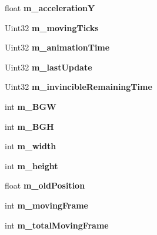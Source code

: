 \begin{DoxyCompactItemize}
\item 
\mbox{\label{class_play_level_aae739f5d0236c708e13a939b15483e16}} 
float {\bfseries m\+\_\+accelerationY}
\item 
\mbox{\label{class_play_level_a1dad415a7ca5e9b2069373fab867c3d0}} 
Uint32 {\bfseries m\+\_\+moving\+Ticks}
\item 
\mbox{\label{class_play_level_a0f69194af1bb5ef30d0263a032cb7c7b}} 
Uint32 {\bfseries m\+\_\+animation\+Time}
\item 
\mbox{\label{class_play_level_a50d5eadc62301030285f8f3382d49b79}} 
Uint32 {\bfseries m\+\_\+last\+Update}
\item 
\mbox{\label{class_play_level_af23a0f5ccc91e31c5e77fb18db4c474d}} 
Uint32 {\bfseries m\+\_\+invincible\+Remaining\+Time}
\item 
\mbox{\label{class_play_level_ab50216560efaf73720364e8141c66e86}} 
int {\bfseries m\+\_\+\+B\+GW}
\item 
\mbox{\label{class_play_level_af81a9afded3da82e441ce59fd3bae593}} 
int {\bfseries m\+\_\+\+B\+GH}
\item 
\mbox{\label{class_play_level_a2a5f3ea59acc42a33f72e4c5eacd6d8e}} 
int {\bfseries m\+\_\+width}
\item 
\mbox{\label{class_play_level_af8b496344ebe76b3b3450ccf89b14708}} 
int {\bfseries m\+\_\+height}
\item 
\mbox{\label{class_play_level_aceb34586e5b67b65c8b77e90285f34fe}} 
float {\bfseries m\+\_\+old\+Position}
\item 
\mbox{\label{class_play_level_a59077894a083c8b85ac0b4d23f85960d}} 
int {\bfseries m\+\_\+moving\+Frame}
\item 
\mbox{\label{class_play_level_a4ec76b83fc96bc3bd78dd8f987e11af5}} 
int {\bfseries m\+\_\+total\+Moving\+Frame}
\item 

\end{DoxyCompactItemize}
